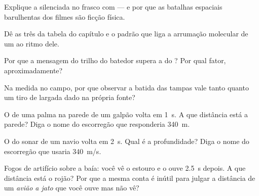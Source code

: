 \begin{exercise}[$\star$]\label{exo:g7:sound-production:3}
Explique a  silenciada no frasco com  --- e por que
as batalhas espaciais barulhentas dos filmes são ficção física.
\end{exercise}

\begin{exercise}[$\star$]\label{exo:g7:sound-production:4}
Dê as três  da tabela do capítulo e o padrão que liga a
arrumação molecular de um  ao ritmo dele.
\end{exercise}

\begin{exercise}[$\star$]\label{exo:g7:sound-production:5}
Por que a mensagem do trilho do batedor supera a do ? Por qual
fator, aproximadamente?
\end{exercise}

\begin{exercise}[$\star$]\label{exo:g7:sound-production:6}
Na medida no campo, por que observar a batida das tampas vale tanto
quanto um tiro de largada dado na própria fonte?
\end{exercise}

\begin{exercise}[$\star$]\label{exo:g7:sound-production:7}
O  de uma palma na parede de um galpão volta em \qty{1}{s}. A que
distância está a parede? Diga o nome do escorregão que responderia
\qty{340}{m}.
\end{exercise}

\begin{exercise}[$\star$]\label{exo:g7:sound-production:8}
O  do sonar de um navio volta em \qty{2}{s}. Qual é a
profundidade? Diga o nome do escorregão que usaria \qty{340}{m/s}.
\end{exercise}

\begin{exercise}[$\star\star$]\label{exo:g7:sound-production:9}
Fogos de artifício sobre a baía: você vê o estouro e o ouve
\qty{2.5}{s} depois. A que distância está o rojão? Por que a mesma
conta é inútil para julgar a distância de um \emph{avião a jato} que
você ouve mas não vê?
\end{exercise}

